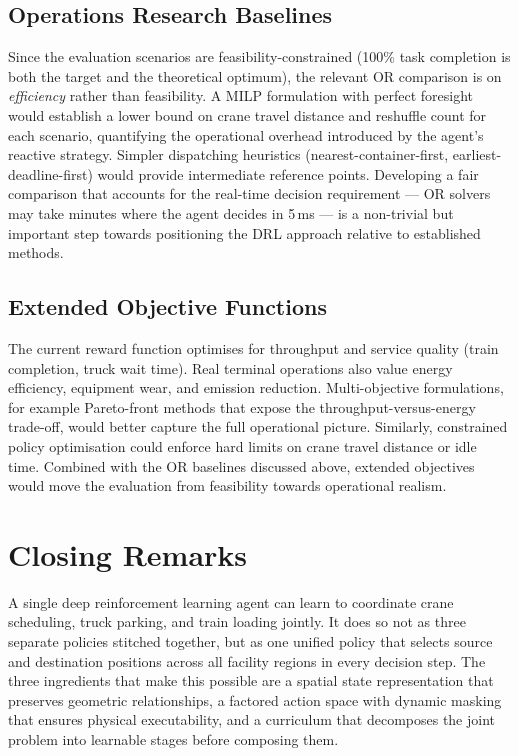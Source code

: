 \subsection{Operations Research Baselines}
\label{sec:concl:future:baselines}

Since the evaluation scenarios are feasibility-constrained (100\% task completion is both the target and the theoretical optimum), the relevant OR comparison is on \emph{efficiency} rather than feasibility. A MILP formulation with perfect foresight would establish a lower bound on crane travel distance and reshuffle count for each scenario, quantifying the operational overhead introduced by the agent's reactive strategy. Simpler dispatching heuristics (nearest-container-first, earliest-deadline-first) would provide intermediate reference points. Developing a fair comparison that accounts for the real-time decision requirement --- OR solvers may take minutes where the agent decides in 5\,ms --- is a non-trivial but important step towards positioning the DRL approach relative to established methods.

\subsection{Extended Objective Functions}
\label{sec:concl:future:objectives}

The current reward function optimises for throughput and service quality (train completion, truck wait time). Real terminal operations also value energy efficiency, equipment wear, and emission reduction. Multi-objective formulations, for example Pareto-front methods that expose the throughput-versus-energy trade-off, would better capture the full operational picture. Similarly, constrained policy optimisation could enforce hard limits on crane travel distance or idle time. Combined with the OR baselines discussed above, extended objectives would move the evaluation from feasibility towards operational realism.

\section{Closing Remarks}
\label{sec:concl:closing}

A single deep reinforcement learning agent can learn to coordinate crane scheduling, truck parking, and train loading jointly. It does so not as three separate policies stitched together, but as one unified policy that selects source and destination positions across all facility regions in every decision step. The three ingredients that make this possible are a spatial state representation that preserves geometric relationships, a factored action space with dynamic masking that ensures physical executability, and a curriculum that decomposes the joint problem into learnable stages before composing them.

